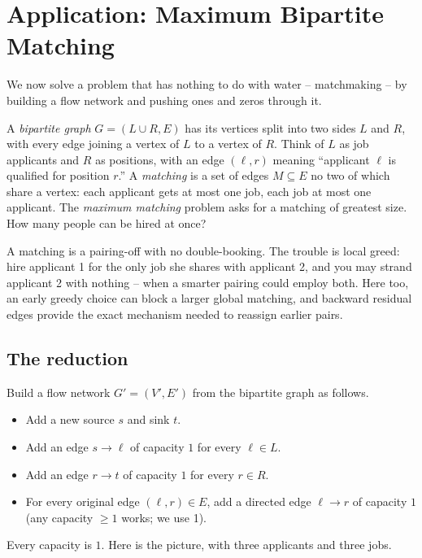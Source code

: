 \section{Application: Maximum Bipartite Matching}
\label{ch26:matching}

We now solve a problem that has nothing to do with water --
matchmaking -- by building a flow network and pushing ones and zeros
through it.

A \emph{bipartite graph} $G = (L \cup R, E)$ has its vertices split into two
sides $L$ and $R$, with every edge joining a vertex of $L$ to a vertex of $R$.
Think of $L$ as job applicants and $R$ as positions, with an edge $(\ell, r)$
meaning ``applicant $\ell$ is qualified for position $r$.'' A \emph{matching} is
a set of edges $M \subseteq E$ no two of which share a vertex: each applicant
gets at most one job, each job at most one applicant. The \emph{maximum
matching} problem asks for a matching of greatest size. How many people can be
hired at once?

\begin{intuitionbox}
A matching is a pairing-off with no double-booking. The trouble is
local greed: hire applicant 1 for the only job she shares with applicant 2, and
you may strand applicant 2 with nothing -- when a smarter pairing could employ
both. Here too, an early greedy choice can block a larger global matching, and
backward residual edges provide the exact mechanism needed to reassign earlier
pairs.
\end{intuitionbox}

\subsection{The reduction}

Build a flow network $G' = (V', E')$ from the bipartite graph as follows.
\begin{itemize}
  \item Add a new source $s$ and sink $t$.
  \item Add an edge $s \to \ell$ of capacity $1$ for every $\ell \in L$.
  \item Add an edge $r \to t$ of capacity $1$ for every $r \in R$.
  \item For every original edge $(\ell, r) \in E$, add a directed edge
        $\ell \to r$ of capacity $1$ (any capacity $\ge 1$ works; we use 1).
\end{itemize}
Every capacity is $1$. Here is the picture, with three applicants and three
jobs.

